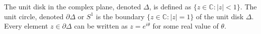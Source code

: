 \documentclass[12pt]{article}
\begin{document}
The unit disk in the complex plane, denoted $\Delta$, is defined as 
$\{ z \in {\mathbb C}: |z| < 1 \}$. The unit circle, denoted $\partial\Delta$ or $S^1$ is the boundary $\{z \in {\mathbb C}: |z|=1 \}$ of the unit disk $\Delta$. Every element $z \in \partial\Delta$ can be written as $z=e^{i \theta}$ for some real value of $\theta$.
\end{document}
